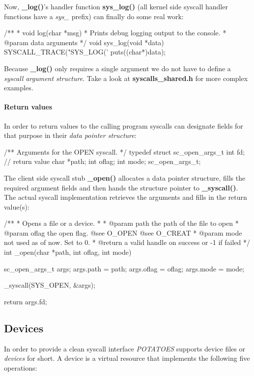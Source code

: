 \documentclass[11pt,a4paper]{scrartcl}
\begin{document}
Now, \textbf{\_log()}'s handler function \textbf{sys\_log()} (all kernel side syscall handler functions have a \textit{sys\_} prefix) can finally do some real work:

\begin{code}[pm\_syscalls.c]
/**
 * void log(char *msg)
 * Prints debug logging output to the console.
 * @param data arguments
 */
void sys_log(void *data)
{
	SYSCALL_TRACE("SYS_LOG('%
	puts((char*)data);
}
\end{code}

Because \textbf{\_log()} only requires a single argument we do not have to define a \textit{syscall argument structure}. Take a look at \textbf{syscalls\_shared.h} for more complex examples.


\paragraph{Return values}
In order to return values to the calling program syscalls can designate fields for that purpose in their \textit{data pointer structure}:

\begin{code}
/** Arguments for the OPEN syscall. */
typedef struct sc_open_args_t {
	int fd; // return value
	char *path;
	int oflag;
	int mode;
} sc_open_args_t;
\end{code}

The client side syscall stub \textbf{\_open()} allocates a data pointer structure, fills the required argument fields and then hands the structure pointer to \textbf{\_syscall()}. The actual syscall implementation retrieves the arguments and fills in the return value(s):

\begin{code}
/**
 * Opens a file or a device.
 * 
 * @param path the path of the file to open
 * @param oflag the open flag. @see O_OPEN @see O_CREAT 
 * @param mode not used as of now. Set to 0.
 * @return a valid handle on success or -1 if failed
 */
int _open(char *path, int oflag, int mode)
{
	sc_open_args_t args;
	args.path = path;
	args.oflag = oflag;
	args.mode = mode;

	_syscall(SYS_OPEN, &args);

	return args.fd;
}
\end{code}

\subsection{Devices}
\hypertarget{DEVICES}{}
In order to provide a clean syscall interface \textit{POTATOES} supports device files or \textit{devices} for short. A device is a virtual resource that implements the following five operations:
\end{document}
